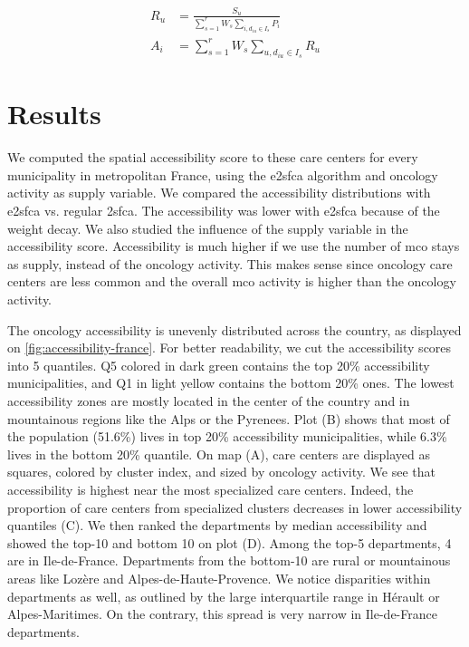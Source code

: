 \begin{align}
    R_u &=  \frac{S_u}{\sum_{s=1}^{r} W_s \sum_{i, d_{iu} \in I_s} P_i} \\
    A_i &= \sum_{s=1}^{r} W_s \sum_{u, d_{iu} \in I_s} R_u
\end{align}

\section{Results}

We computed the spatial accessibility score to these care centers for every municipality in metropolitan France, using the \ac{e2sfca} algorithm and oncology activity as supply variable. We compared the accessibility distributions with \ac{e2sfca} vs. regular \ac{2sfca}. The accessibility was lower with \ac{e2sfca} because of the weight decay. We also studied the influence of the supply variable in the accessibility score. Accessibility is much higher if we use the number of \ac{mco} stays as supply, instead of the oncology activity. This makes sense since oncology care centers are less common and the overall \ac{mco} activity is higher than the oncology activity.

The oncology accessibility is unevenly distributed across the country, as displayed on \cref{fig:accessibility-france}. For better readability, we cut the accessibility scores into 5 quantiles. Q5 colored in dark green contains the top 20\% accessibility municipalities, and Q1 in light yellow contains the bottom 20\% ones. The lowest accessibility zones are mostly located in the center of the country and in mountainous regions like the Alps or the Pyrenees. Plot (B) shows that most of the population (51.6\%) lives in top 20\% accessibility municipalities, while 6.3\% lives in the bottom 20\% quantile. On map (A), care centers are displayed as squares, colored by cluster index, and sized by oncology activity. We see that accessibility is highest near the most specialized care centers. Indeed, the proportion of care centers from specialized clusters decreases in lower accessibility quantiles (C). We then ranked the departments by median accessibility and showed the top-10 and bottom 10 on plot (D). Among the top-5 departments, 4 are in Ile-de-France. Departments from the bottom-10 are rural or mountainous areas like Lozère and Alpes-de-Haute-Provence.  We notice disparities within departments as well, as outlined by the large interquartile range in Hérault or Alpes-Maritimes. On the contrary, this spread is very narrow in Ile-de-France departments.

